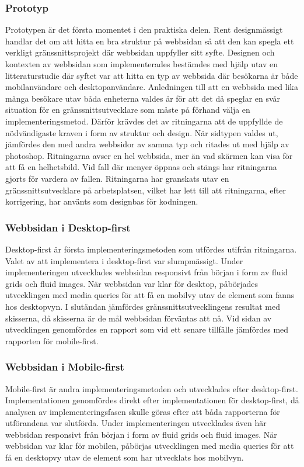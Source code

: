 \documentclass[11pt]{article}
\begin{document}
\subsubsection{Prototyp}
Prototypen är det första momentet i den praktiska delen. Rent designmässigt handlar det om att hitta en bra struktur på webbsidan så att den kan spegla ett verkligt gränssnittsprojekt där webbsidan uppfyller sitt syfte. Designen och kontexten av webbsidan som implementerades bestämdes med hjälp utav en litteraturstudie där syftet var att hitta en typ av webbsida där besökarna är både mobilanvändare och desktopanvändare. Anledningen till att en webbsida med lika många besökare utav båda enheterna valdes är för att det då speglar en svår situation för en gränssnittsutvecklare som måste på förhand välja en implementeringsmetod. Därför krävdes det av ritningarna att de uppfyllde de nödvändigaste kraven i form av struktur och design. När sidtypen valdes ut, jämfördes den med andra webbsidor av samma typ och ritades ut med hjälp av photoshop. Ritningarna avser en hel webbsida, mer än vad skärmen kan visa för att få en helhetsbild. Vid fall där menyer öppnas och stängs har ritningarna gjorts för vardera av fallen. Ritningarna har granskats utav en gränssnittsutvecklare på arbetsplatsen, vilket har lett till att ritningarna, efter korrigering, har använts som designbas för kodningen. 
  
\subsubsection{Webbsidan i Desktop-first}
Desktop-first är första implementeringsmetoden som utfördes utifrån ritningarna. Valet av att implementera i desktop-first var slumpmässigt. Under implementeringen utvecklades webbsidan responsivt från början i form av fluid grids och fluid images. När webbsidan var klar för desktop, påbörjades utvecklingen med media queries för att få en mobilvy utav de element som fanns hos desktopvyn. I slutändan jämfördes gränssnittsutvecklingens resultat med skisserna, då skisserna är de mål webbsidan förväntas att nå. Vid sidan av utvecklingen genomfördes en rapport som vid ett senare tillfälle jämfördes med rapporten för mobile-first.

\subsubsection{Webbsidan i Mobile-first}
Mobile-first är andra implementeringsmetoden och utvecklades efter desktop-first. Implementationen genomfördes direkt efter implementationen för desktop-first, då analysen av implementeringsfasen skulle göras efter att båda rapporterna för utförandena var slutförda. Under implementeringen utvecklades även här webbsidan responsivt från början i form av fluid grids och fluid images. När webbsidan var klar för mobilen, påbörjas utvecklingen med media queries för att få en desktopvy utav de element som har utvecklats hos mobilvyn.
\end{document}
